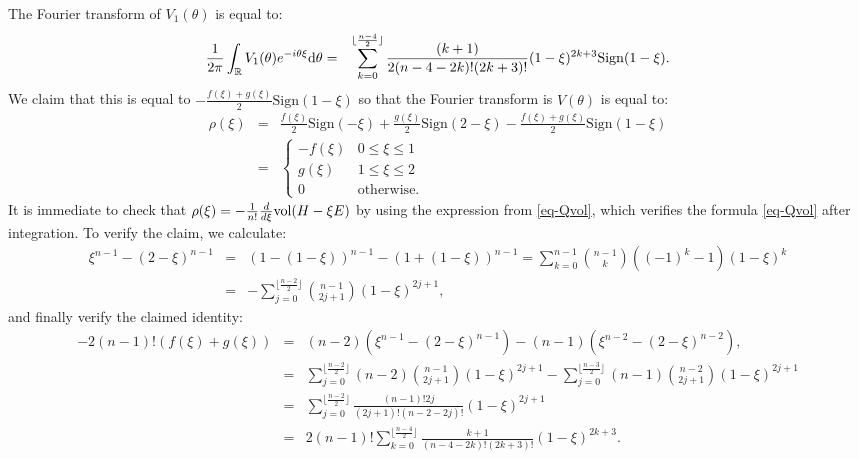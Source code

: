 \documentclass[12pt]{amsart}
\theoremstyle{definition}
\def\dif{{\rm d}}
\def\vol{{\rm vol}}
\newcommand{\IR}{{\mathbb R}}
\newcommand{\CO}{{\mathcal O}}
\begin{document}
The Fourier transform of $V_1(\theta)$ is equal to:
\begin{eqnarray*}
    \frac{1}{2\pi}\int_{\IR} V_1(\theta) e^{-i\theta \xi}\dif\theta&=&\sum_{k=0}^{\lfloor \frac{n-4}{2}\rfloor}\frac{(k+1)}{2(n-4-2k)!(2k+3)!}(1-\xi)^{2k+3} \mathrm{Sign}(1-\xi). 
\end{eqnarray*}
We claim that this is equal to $-\frac{f(\xi)+g(\xi)}{2}\mathrm{Sign}(1-\xi)$ so that the Fourier transform is $V(\theta)$ is equal to:
\begin{eqnarray*}
    \rho(\xi)&=&\frac{f(\xi)}{2}\mathrm{Sign}(-\xi)+\frac{g(\xi)}{2}\mathrm{Sign}(2-\xi)-\frac{f(\xi)+g(\xi)}{2}\mathrm{Sign}(1-\xi)\\
    &=& 
    \left\{\begin{array}{ll}
    -f(\xi) & 0\le \xi\le 1\\
    g(\xi) & 1\le \xi\le 2\\
    0 & \mathrm{otherwise}.
    \end{array}\right.
\end{eqnarray*}
It is immediate to check that $\rho(\xi)=-\frac{1}{n!}\frac{d}{d\xi} \vol(H-\xi E)$ by using the expression from \eqref{eq-Qvol}, which verifies the formula \eqref{eq-Qvol} after integration. 
To verify the claim, we calculate:
\begin{eqnarray*}
    \xi^{n-1}-(2-\xi)^{n-1}&=&(1-(1-\xi))^{n-1}-(1+(1-\xi))^{n-1}=\sum_{k=0}^{n-1}\binom{n-1}{k}((-1)^{k}-1)(1-\xi)^k\\
    &=&-\sum_{j=0}^{\lfloor \frac{n-2}{2}\rfloor} \binom{n-1}{2j+1} (1-\xi)^{2j+1},
\end{eqnarray*}
and finally verify the claimed identity:
\begin{eqnarray*}
    -2 (n-1)!(f(\xi)+g(\xi))&=& (n-2)(\xi^{n-1}-(2-\xi)^{n-1})-(n-1)(\xi^{n-2}-(2-\xi)^{n-2}),\\
    &=& \sum_{j=0}^{\lfloor \frac{n-2}{2}\rfloor} (n-2)\binom{n-1}{2j+1}(1-\xi)^{2j+1}-\sum_{j=0}^{\lfloor \frac{n-3}{2}\rfloor}(n-1)\binom{n-2}{2j+1}(1-\xi)^{2j+1}\\
    &=&\sum_{j=0}^{\lfloor \frac{n-2}{2}\rfloor}\frac{(n-1)!2j}{(2j+1)!(n-2-2j)!}(1-\xi)^{2j+1}\\
    &=&2(n-1)! \sum_{k=0}^{\lfloor \frac{n-4}{2}\rfloor}\frac{k+1}{(n-4-2k)!(2k+3)!}(1-\xi)^{2k+3}. 
    \end{eqnarray*}

    
        
   
    
    
    


\end{document}
